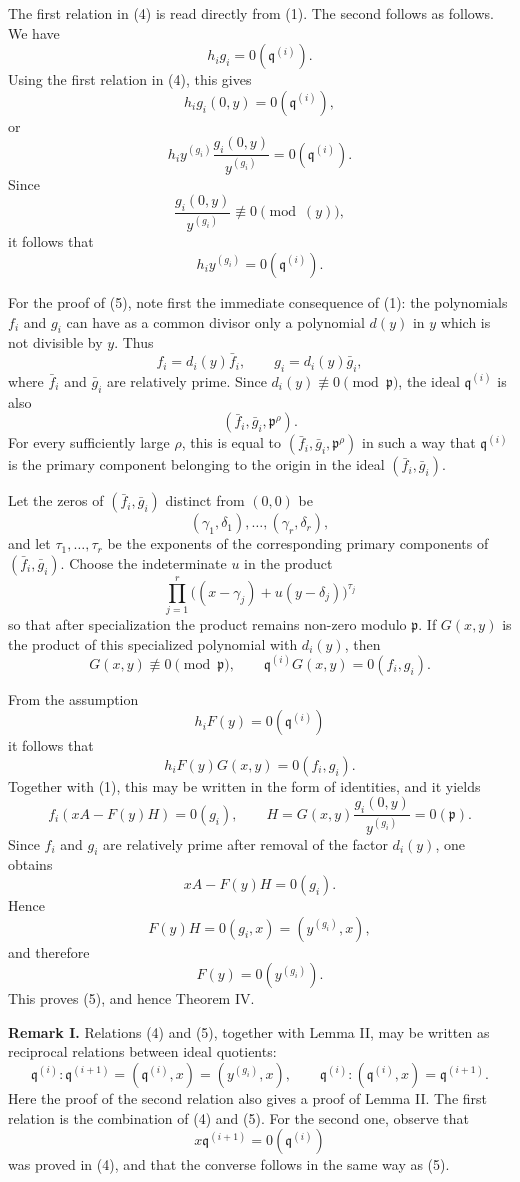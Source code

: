 \documentclass[11pt]{article}
\begin{document}
The first relation in (4) is read directly from (1). The second follows as follows. We have
\[
  h_i g_i=0(\mathfrak q^{(i)}).
\]
Using the first relation in (4), this gives
\[
  h_i g_i(0,y)=0(\mathfrak q^{(i)}),
\]
or
\[
  h_i y^{(g_i)}\frac{g_i(0,y)}{y^{(g_i)}}=0(\mathfrak q^{(i)}).
\]
Since
\[
  \frac{g_i(0,y)}{y^{(g_i)}}\not\equiv 0\pmod{(y)},
\]
it follows that
\[
  h_i y^{(g_i)}=0(\mathfrak q^{(i)}).
\]

For the proof of (5), note first the immediate consequence of (1): the polynomials \(f_i\) and \(g_i\) can have as a common divisor only a polynomial \(d(y)\) in \(y\) which is not divisible by \(y\). Thus
\[
  f_i=d_i(y)\bar f_i,
  \qquad
  g_i=d_i(y)\bar g_i,
\]
where \(\bar f_i\) and \(\bar g_i\) are relatively prime. Since \(d_i(y)\not\equiv0\pmod{\mathfrak p}\), the ideal \(\mathfrak q^{(i)}\) is also
\[
  (\bar f_i,\bar g_i,\mathfrak p^{\rho}).
\]
For every sufficiently large \(\rho\), this is equal to \((\bar f_i,\bar g_i,\mathfrak p^{\rho})\) in such a way that \(\mathfrak q^{(i)}\) is the primary component belonging to the origin in the ideal \((\bar f_i,\bar g_i)\).

Let the zeros of \((\bar f_i,\bar g_i)\) distinct from \((0,0)\) be
\[
  (\gamma_1,\delta_1),\ldots,(\gamma_r,\delta_r),
\]
and let \(\tau_1,\ldots,\tau_r\) be the exponents of the corresponding primary components of \((\bar f_i,\bar g_i)\). Choose the indeterminate \(u\) in the product
\[
  \prod_{j=1}^{r}\bigl((x-
\gamma_j)+u(y-\delta_j)\bigr)^{\tau_j}
\]
so that after specialization the product remains non-zero modulo \(\mathfrak p\). If \(G(x,y)\) is the product of this specialized polynomial with \(d_i(y)\), then
\[
  G(x,y)\not\equiv0\pmod{\mathfrak p},
  \qquad
  \mathfrak q^{(i)}G(x,y)=0(f_i,g_i).
\]

From the assumption
\[
  h_iF(y)=0(\mathfrak q^{(i)})
\]
it follows that
\[
  h_iF(y)G(x,y)=0(f_i,g_i).
\]
Together with (1), this may be written in the form of identities, and it yields
\[
  f_i(xA-F(y)H)=0(g_i),
  \qquad
  H=G(x,y)\frac{g_i(0,y)}{y^{(g_i)}}=0(\mathfrak p).
\]
Since \(f_i\) and \(g_i\) are relatively prime after removal of the factor \(d_i(y)\), one obtains
\[
  xA-F(y)H=0(g_i).
\]
Hence
\[
  F(y)H=0(g_i,x)=(y^{(g_i)},x),
\]
and therefore
\[
  F(y)=0(y^{(g_i)}).
\]
This proves (5), and hence Theorem IV.

\textbf{Remark I.} Relations (4) and (5), together with Lemma II, may be written as reciprocal relations between ideal quotients:
\[
  \mathfrak q^{(i)}:\mathfrak q^{(i+1)}
  = (\mathfrak q^{(i)},x)
  = (y^{(g_i)},x),
  \qquad
  \mathfrak q^{(i)}:(\mathfrak q^{(i)},x)
  = \mathfrak q^{(i+1)}.
\tag{6}
\]
Here the proof of the second relation also gives a proof of Lemma II. The first relation is the combination of (4) and (5). For the second one, observe that
\[
  x\mathfrak q^{(i+1)}=0(\mathfrak q^{(i)})
\]
was proved in (4), and that the converse follows in the same way as (5).
\end{document}

